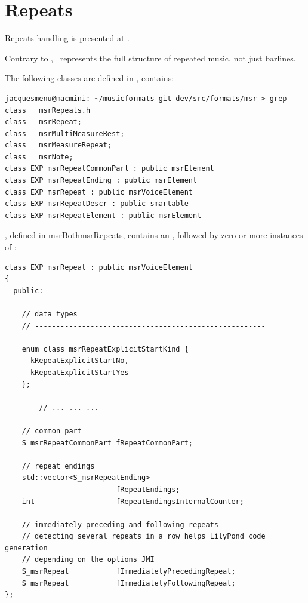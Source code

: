\section{Repeats}\label{Repeats}

Repeats handling is presented at .

Contrary to \mxml, \mf\ represents the full structure of repeated music, not just barlines.

The following classes are defined in , contains:
\begin{lstlisting}[language=Terminal]
jacquesmenu@macmini: ~/musicformats-git-dev/src/formats/msr > grep class   msrRepeats.h
class   msrRepeat;
class   msrMultiMeasureRest;
class   msrMeasureRepeat;
class   msrNote;
class EXP msrRepeatCommonPart : public msrElement
class EXP msrRepeatEnding : public msrElement
class EXP msrRepeat : public msrVoiceElement
class EXP msrRepeatDescr : public smartable
class EXP msrRepeatElement : public msrElement
\end{lstlisting}

, defined in msrBoth{msrRepeats}, contains an , followed by zero or more instances of :
\begin{lstlisting}[language=CPlusPlus]
class EXP msrRepeat : public msrVoiceElement
{
  public:

    // data types
    // ------------------------------------------------------

    enum class msrRepeatExplicitStartKind {
      kRepeatExplicitStartNo,
      kRepeatExplicitStartYes
    };

		// ... ... ...

    // common part
    S_msrRepeatCommonPart fRepeatCommonPart;

    // repeat endings
    std::vector<S_msrRepeatEnding>
                          fRepeatEndings;
    int                   fRepeatEndingsInternalCounter;

    // immediately preceding and following repeats
    // detecting several repeats in a row helps LilyPond code generation
    // depending on the options JMI
    S_msrRepeat           fImmediatelyPrecedingRepeat;
    S_msrRepeat           fImmediatelyFollowingRepeat;
};
\end{lstlisting}

